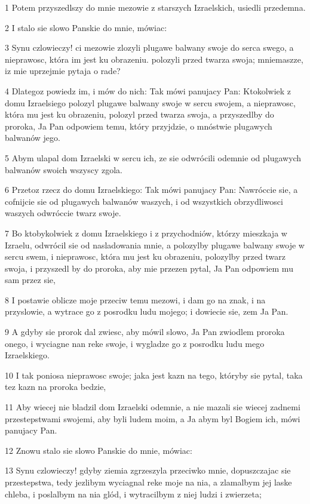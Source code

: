 \par 1 Potem przyszedlszy do mnie mezowie z starszych Izraelskich, usiedli przedemna.
\par 2 I stalo sie slowo Panskie do mnie, mówiac:
\par 3 Synu czlowieczy! ci mezowie zlozyli plugawe balwany swoje do serca swego, a nieprawosc, która im jest ku obrazeniu. polozyli przed twarza swoja; mniemaszze, iz mie uprzejmie pytaja o rade?
\par 4 Dlategoz powiedz im, i mów do nich: Tak mówi panujacy Pan: Ktokolwiek z domu Izraelsiego polozyl plugawe balwany swoje w sercu swojem, a nieprawosc, która mu jest ku obrazeniu, polozyl przed twarza swoja, a przyszedlby do proroka, Ja Pan odpowiem temu, który przyjdzie, o mnóstwie plugawych balwanów jego.
\par 5 Abym ulapal dom Izraelski w sercu ich, ze sie odwrócili odemnie od plugawych balwanów swoich wszyscy zgola.
\par 6 Przetoz rzecz do domu Izraelskiego: Tak mówi panujacy Pan: Nawróccie sie, a cofnijcie sie od plugawych balwanów waszych, i od wszystkich obrzydliwosci waszych odwróccie twarz swoje.
\par 7 Bo ktobykolwiek z domu Izraelskiego i z przychodniów, którzy mieszkaja w Izraelu, odwrócil sie od nasladowania mnie, a polozylby plugawe balwany swoje w sercu swem, i nieprawosc, która mu jest ku obrazeniu, polozylby przed twarz swoja, i przyszedl by do proroka, aby mie przezen pytal, Ja Pan odpowiem mu sam przez sie,
\par 8 I postawie oblicze moje przeciw temu mezowi, i dam go na znak, i na przyslowie, a wytrace go z posrodku ludu mojego; i dowiecie sie, zem Ja Pan.
\par 9 A gdyby sie prorok dal zwiesc, aby mówil slowo, Ja Pan zwiodlem proroka onego, i wyciagne nan reke swoje, i wygladze go z posrodku ludu mego Izraelskiego.
\par 10 I tak poniosa nieprawosc swoje; jaka jest kazn na tego, któryby sie pytal, taka tez kazn na proroka bedzie,
\par 11 Aby wiecej nie bladzil dom Izraelski odemnie, a nie mazali sie wiecej zadnemi przestepstwami swojemi, aby byli ludem moim, a Ja abym byl Bogiem ich, mówi panujacy Pan.
\par 12 Znowu stalo sie slowo Panskie do mnie, mówiac:
\par 13 Synu czlowieczy! gdyby ziemia zgrzeszyla przeciwko mnie, dopuszczajac sie przestepstwa, tedy jezlibym wyciagnal reke moje na nia, a zlamalbym jej laske chleba, i poslalbym na nia glód, i wytracilbym z niej ludzi i zwierzeta;
